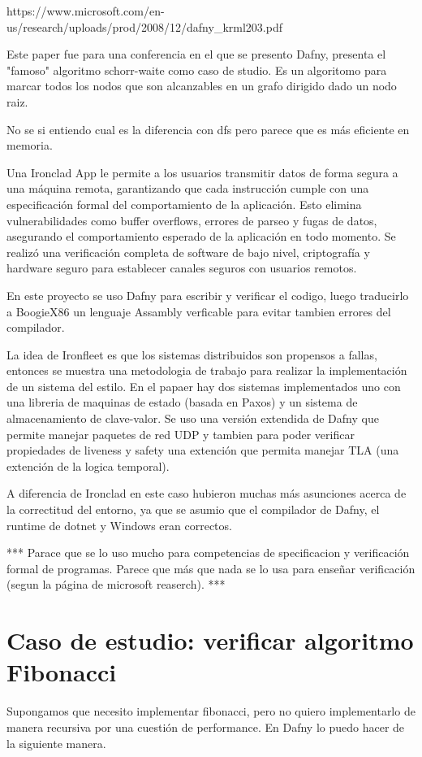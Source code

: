 \documentclass[runningheads]{llncs}
\begin{document}
https://www.microsoft.com/en-us/research/uploads/prod/2008/12/dafny\_krml203.pdf

Este paper fue para una conferencia en el que se presento Dafny, presenta el "famoso" algoritmo schorr-waite como caso de studio. Es un algoritomo para marcar todos los nodos que son alcanzables en un grafo dirigido dado un nodo raiz.

No se si entiendo cual es la diferencia con dfs pero parece que es más eficiente en memoria.

Una Ironclad\cite{hawblitzel2014ironclad} App le permite a los usuarios transmitir datos de forma segura a una máquina remota, garantizando que cada instrucción cumple con una especificación formal del comportamiento de la aplicación. Esto elimina vulnerabilidades como buffer overflows, errores de parseo y fugas de datos, asegurando el comportamiento esperado de la aplicación en todo momento. Se realizó una verificación completa de software de bajo nivel, criptografía y hardware seguro para establecer canales seguros con usuarios remotos.

En este proyecto se uso Dafny para escribir y verificar el codigo, luego traducirlo a BoogieX86 un lenguaje Assambly verficable para evitar tambien errores del compilador.

La idea de Ironfleet\cite{hawblitzel2015ironfleet} es que los sistemas distribuidos son propensos a fallas, entonces se muestra una metodologia de trabajo para realizar la implementación de un sistema del estilo. En el papaer hay dos sistemas implementados uno con una libreria de maquinas de estado (basada en Paxos) y un sistema de almacenamiento de clave-valor.
Se uso una versión extendida de Dafny que permite manejar paquetes de red UDP y tambien para poder verificar propiedades de liveness y safety una extención que permita manejar TLA (una extención de la logica temporal).

A diferencia de Ironclad en este caso hubieron muchas más asunciones acerca de la correctitud del entorno, ya que se asumio que el compilador de Dafny, el runtime de dotnet y Windows eran correctos.

***
Parace que se lo uso mucho para competencias de specificacion y verificación formal de programas.
Parece que más que nada se lo usa para enseñar verificación (segun la página de microsoft reaserch).
***
\section{Caso de estudio: verificar algoritmo Fibonacci}
Supongamos que necesito implementar fibonacci, pero no quiero implementarlo de manera recursiva por una cuestión de performance. En Dafny lo puedo hacer de la siguiente manera.
\end{document}
